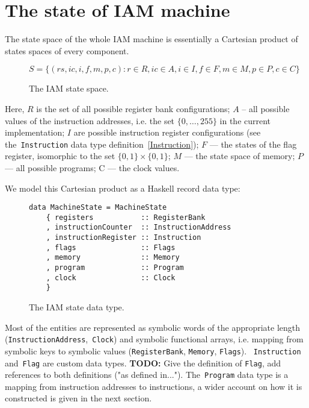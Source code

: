 \section{The state of IAM machine}

The state space of the whole IAM machine is essentially a Cartesian product of states spaces
of every component.

\begin{figure}[H]
\centering
$S = \{(rs, ic, i, f, m, p, c) : r \in R, ic \in A, i \in I, f \in F, m \in M, p \in P, c \in C\}$
\caption{The IAM state space.}
\label{stateSpace}
\end{figure}

Here, $R$ is the set of all possible register bank configurations; $A$ -- all possible values
of the instruction addresses, i.e. the set $\{0,\ldots,255\}$ in the current implementation;
$I$ are possible instruction register configurations (see the~\texttt{Instruction}
data type definition~\ref{Instruction}); $F$ --- the states of the flag register, isomorphic to the set
$\{0,1\} \times \{0,1\}$; $M$ --- the state space of memory; $P$ --- all possible programs;
C --- the clock values.

We model this Cartesian product as a Haskell record data type:

\begin{figure}[H]
\begin{verbatim}
data MachineState = MachineState
    { registers           :: RegisterBank
    , instructionCounter  :: InstructionAddress
    , instructionRegister :: Instruction
    , flags               :: Flags
    , memory              :: Memory
    , program             :: Program
    , clock               :: Clock
    }
\end{verbatim}
\caption{The IAM state data type.}
\label{state}
\end{figure}

Most of the entities are represented as symbolic words of the appropriate
length (\texttt{InstructionAddress},~\texttt{Clock}) and
symbolic functional arrays, i.e. mapping from symbolic keys to symbolic
values (\texttt{RegisterBank}, \texttt{Memory}, \texttt{Flags}).
~\texttt{Instruction} and~\texttt{Flag} are custom data types.
\textbf{TODO:} Give the definition of \texttt{Flag}, add references to both
definitions ("as defined in...").
The~\texttt{Program} data type is a mapping from instruction addresses to
instructions, a wider account on how it is constructed is given in the next section.